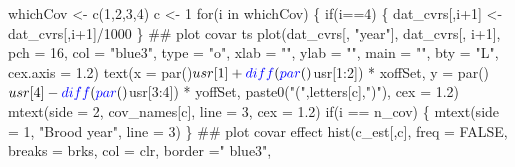 \documentclass[11pt,]{article}
\newenvironment{Shaded}{}{}
\newcommand{\KeywordTok}[1]{\textcolor[rgb]{0.00,0.00,1.00}{#1}}
\newcommand{\DataTypeTok}[1]{#1}
\newcommand{\DecValTok}[1]{#1}
\newcommand{\FloatTok}[1]{#1}
\newcommand{\StringTok}[1]{\textcolor[rgb]{0.00,0.50,0.50}{#1}}
\newcommand{\OtherTok}[1]{\textcolor[rgb]{1.00,0.25,0.00}{#1}}
\newcommand{\ControlFlowTok}[1]{\textcolor[rgb]{0.00,0.00,1.00}{#1}}
\newcommand{\OperatorTok}[1]{#1}
\newcommand{\NormalTok}[1]{#1}
\begin{document}
\begin{Shaded}
\begin{Highlighting}[]
\NormalTok{whichCov <-}\StringTok{ }\KeywordTok{c}\NormalTok{(}\DecValTok{1}\NormalTok{,}\DecValTok{2}\NormalTok{,}\DecValTok{3}\NormalTok{,}\DecValTok{4}\NormalTok{)}
\NormalTok{c <-}\StringTok{ }\DecValTok{1}
\ControlFlowTok{for}\NormalTok{(i }\ControlFlowTok{in}\NormalTok{ whichCov) \{}
  \ControlFlowTok{if}\NormalTok{(i}\OperatorTok{==}\DecValTok{4}\NormalTok{) \{}
\NormalTok{    dat_cvrs[,i}\OperatorTok{+}\DecValTok{1}\NormalTok{] <-}\StringTok{ }\NormalTok{dat_cvrs[,i}\OperatorTok{+}\DecValTok{1}\NormalTok{]}\OperatorTok{/}\DecValTok{1000}
\NormalTok{  \}}
\NormalTok{  ## plot covar ts}
  \KeywordTok{plot}\NormalTok{(dat_cvrs[, }\StringTok{"year"}\NormalTok{], dat_cvrs[, i}\OperatorTok{+}\DecValTok{1}\NormalTok{],}
       \DataTypeTok{pch =} \DecValTok{16}\NormalTok{, }\DataTypeTok{col =} \StringTok{"blue3"}\NormalTok{, }\DataTypeTok{type =} \StringTok{"o"}\NormalTok{,}
       \DataTypeTok{xlab =} \StringTok{""}\NormalTok{, }\DataTypeTok{ylab =} \StringTok{""}\NormalTok{, }\DataTypeTok{main =} \StringTok{""}\NormalTok{, }\DataTypeTok{bty =} \StringTok{"L"}\NormalTok{,}
       \DataTypeTok{cex.axis =} \FloatTok{1.2}\NormalTok{)}
  \KeywordTok{text}\NormalTok{(}\DataTypeTok{x =} \KeywordTok{par}\NormalTok{()}\OperatorTok{$}\NormalTok{usr[}\DecValTok{1}\NormalTok{] }\OperatorTok{+}\StringTok{ }\KeywordTok{diff}\NormalTok{(}\KeywordTok{par}\NormalTok{()}\OperatorTok{$}\NormalTok{usr[}\DecValTok{1}\OperatorTok{:}\DecValTok{2}\NormalTok{]) }\OperatorTok{*}\StringTok{ }\NormalTok{xoffSet,}
       \DataTypeTok{y =} \KeywordTok{par}\NormalTok{()}\OperatorTok{$}\NormalTok{usr[}\DecValTok{4}\NormalTok{] }\OperatorTok{-}\StringTok{ }\KeywordTok{diff}\NormalTok{(}\KeywordTok{par}\NormalTok{()}\OperatorTok{$}\NormalTok{usr[}\DecValTok{3}\OperatorTok{:}\DecValTok{4}\NormalTok{]) }\OperatorTok{*}\StringTok{ }\NormalTok{yoffSet,}
       \KeywordTok{paste0}\NormalTok{(}\StringTok{"("}\NormalTok{,letters[c],}\StringTok{")"}\NormalTok{),}
       \DataTypeTok{cex =} \FloatTok{1.2}\NormalTok{)}
  \KeywordTok{mtext}\NormalTok{(}\DataTypeTok{side =} \DecValTok{2}\NormalTok{, cov_names[c], }\DataTypeTok{line =} \DecValTok{3}\NormalTok{, }\DataTypeTok{cex =} \FloatTok{1.2}\NormalTok{)}
  \ControlFlowTok{if}\NormalTok{(i }\OperatorTok{==}\StringTok{ }\NormalTok{n_cov) \{}
    \KeywordTok{mtext}\NormalTok{(}\DataTypeTok{side =} \DecValTok{1}\NormalTok{, }\StringTok{"Brood year"}\NormalTok{, }\DataTypeTok{line =} \DecValTok{3}\NormalTok{)}
\NormalTok{  \}}
\NormalTok{  ## plot covar effect}
  \KeywordTok{hist}\NormalTok{(c_est[,c],}
       \DataTypeTok{freq =} \OtherTok{FALSE}\NormalTok{, }\DataTypeTok{breaks =}\NormalTok{ brks, }\DataTypeTok{col =}\NormalTok{ clr, }\DataTypeTok{border =}\StringTok{" blue3"}\NormalTok{,}

\end{Highlighting}
\end{Shaded}
\end{document}
